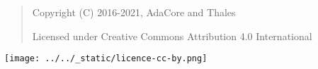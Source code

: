 \bigskip
\begin{quote}
   Copyright (C) 2016-2021, AdaCore and Thales

   Licensed under Creative Commons Attribution 4.0 International
\end{quote}

\texttt{[image: ../../\_static/licence-cc-by.png]}
\bigskip
